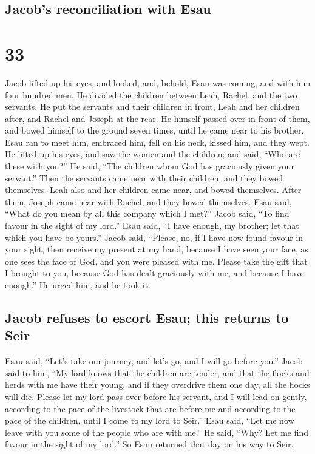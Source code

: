 \hypertarget{jacobs-reconciliation-with-esau}{%
\subsection{Jacob's reconciliation with
Esau}\label{jacobs-reconciliation-with-esau}}

\hypertarget{section-32}{%
\section{33}\label{section-32}}

 Jacob lifted up his eyes, and looked, and, behold, Esau
was coming, and with him four hundred men. He divided the children
between Leah, Rachel, and the two servants.  He put the
servants and their children in front, Leah and her children after, and
Rachel and Joseph at the rear.  He himself passed over in
front of them, and bowed himself to the ground seven times, until he
came near to his brother.  Esau ran to meet him, embraced
him, fell on his neck, kissed him, and they wept.  He
lifted up his eyes, and saw the women and the children; and said, ``Who
are these with you?'' He said, ``The children whom God has graciously
given your servant.''  Then the servants came near with
their children, and they bowed themselves.  Leah also and
her children came near, and bowed themselves. After them, Joseph came
near with Rachel, and they bowed themselves.  Esau said,
``What do you mean by all this company which I met?'' Jacob said, ``To
find favour in the sight of my lord.''  Esau said, ``I
have enough, my brother; let that which you have be yours.''
 Jacob said, ``Please, no, if I have now found favour in
your sight, then receive my present at my hand, because I have seen your
face, as one sees the face of God, and you were pleased with me.
 Please take the gift that I brought to you, because God
has dealt graciously with me, and because I have enough.'' He urged him,
and he took it.

\hypertarget{jacob-refuses-to-escort-esau-this-returns-to-seir}{%
\subsection{Jacob refuses to escort Esau; this returns to
Seir}\label{jacob-refuses-to-escort-esau-this-returns-to-seir}}

 Esau said, ``Let's take our journey, and let's go, and I
will go before you.''  Jacob said to him, ``My lord knows
that the children are tender, and that the flocks and herds with me have
their young, and if they overdrive them one day, all the flocks will
die.  Please let my lord pass over before his servant,
and I will lead on gently, according to the pace of the livestock that
are before me and according to the pace of the children, until I come to
my lord to Seir.''  Esau said, ``Let me now leave with
you some of the people who are with me.'' He said, ``Why? Let me find
favour in the sight of my lord.''  So Esau returned that
day on his way to Seir.

